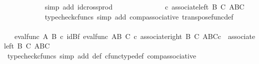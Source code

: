 \begin{isabellebody}
\ \ \ \ \ \ \ \ \ \ \isamarkupfalse%
\ {\isacharparenleft}{\kern0pt}simp\ add{\isacharcolon}{\kern0pt}\ id{\isacharunderscore}{\kern0pt}cross{\isacharunderscore}{\kern0pt}prod{\isacharparenright}{\kern0pt}\isanewline
\ \ \ \ \ \ \ \ \isamarkupfalse%
\ \isamarkupfalse%
\ {\isachardoublequoteopen}{\isachardot}{\kern0pt}{\isachardot}{\kern0pt}{\isachardot}{\kern0pt}\ {\isacharequal}{\kern0pt}\ {\isasympsi}\ {\isasymcirc}\isactrlsub c\ associate{\isacharunderscore}{\kern0pt}left\ B\ C\ {\isacharparenleft}{\kern0pt}{\isacharparenleft}{\kern0pt}A\isactrlbsup B\isactrlesup {\isacharparenright}{\kern0pt}\isactrlbsup C\isactrlesup {\isacharparenright}{\kern0pt}{\isachardoublequoteclose}\isanewline
\ \ \ \ \ \ \ \ \ \ \isamarkupfalse%
\ {\isacharparenleft}{\kern0pt}typecheck{\isacharunderscore}{\kern0pt}cfuncs{\isacharcomma}{\kern0pt}\ simp\ add{\isacharcolon}{\kern0pt}\ comp{\isacharunderscore}{\kern0pt}associative{}\ transpose{\isacharunderscore}{\kern0pt}func{\isacharunderscore}{\kern0pt}def{\isacharparenright}{\kern0pt}\isanewline
\ \ \ \ \ \ \ \ \isamarkupfalse%
\ \isamarkupfalse%
\ {\isachardoublequoteopen}{\isachardot}{\kern0pt}{\isachardot}{\kern0pt}{\isachardot}{\kern0pt}\ {\isacharequal}{\kern0pt}\ {\isacharparenleft}{\kern0pt}{\isacharparenleft}{\kern0pt}eval{\isacharunderscore}{\kern0pt}func\ A\ B{\isacharparenright}{\kern0pt}\ {\isasymcirc}\isactrlsub c\ {\isacharparenleft}{\kern0pt}id{\isacharparenleft}{\kern0pt}B{\isacharparenright}{\kern0pt}{\isasymtimes}\isactrlsub f\ eval{\isacharunderscore}{\kern0pt}func\ {\isacharparenleft}{\kern0pt}A\isactrlbsup B\isactrlesup {\isacharparenright}{\kern0pt}\ C{\isacharparenright}{\kern0pt}{\isacharparenright}{\kern0pt}\ {\isasymcirc}\isactrlsub c\ {\isacharparenleft}{\kern0pt}{\isacharparenleft}{\kern0pt}associate{\isacharunderscore}{\kern0pt}right\ B\ C\ {\isacharparenleft}{\kern0pt}{\isacharparenleft}{\kern0pt}A\isactrlbsup B\isactrlesup {\isacharparenright}{\kern0pt}\isactrlbsup C\isactrlesup {\isacharparenright}{\kern0pt}{\isacharparenright}{\kern0pt}{\isasymcirc}\isactrlsub c\ \ associate{\isacharunderscore}{\kern0pt}left\ B\ C\ {\isacharparenleft}{\kern0pt}{\isacharparenleft}{\kern0pt}A\isactrlbsup B\isactrlesup {\isacharparenright}{\kern0pt}\isactrlbsup C\isactrlesup {\isacharparenright}{\kern0pt}{\isacharparenright}{\kern0pt}{\isachardoublequoteclose}\isanewline
\ \ \ \ \ \ \ \ \ \ \isamarkupfalse%
\ {\isacharparenleft}{\kern0pt}typecheck{\isacharunderscore}{\kern0pt}cfuncs{\isacharcomma}{\kern0pt}\ simp\ add{\isacharcolon}{\kern0pt}\ {\isasympsi}{\isacharunderscore}{\kern0pt}def\ cfunc{\isacharunderscore}{\kern0pt}type{\isacharunderscore}{\kern0pt}def\ comp{\isacharunderscore}{\kern0pt}associative{\isacharparenright}{\kern0pt}\isanewline

\end{isabellebody}
